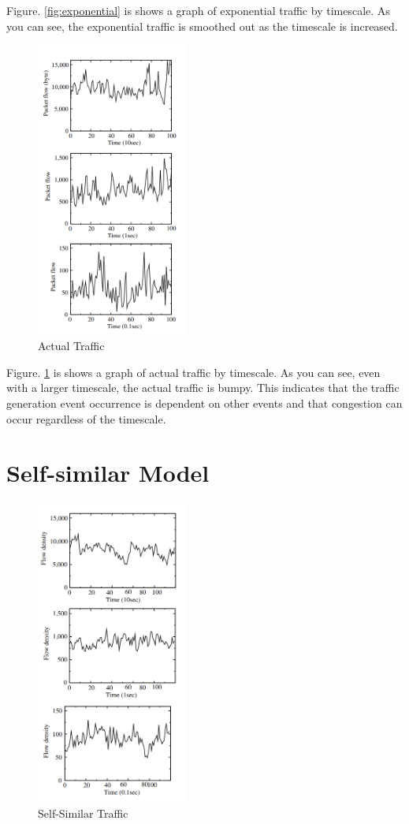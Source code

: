 Figure. \ref{fig:exponential} is shows a graph of exponential traffic by timescale.
As you can see, the exponential traffic is smoothed out as the timescale is increased.

  \begin{figure}[ht]
    \centering
    \includegraphics[width=5cm]{img/actual.png}
    \caption{Actual Traffic \protect \footnotemark}
    \label{fig:actual}  
  \end{figure}

Figure. \ref{fig:actual} is shows a graph of actual traffic by timescale.
As you can see, even with a larger timescale, the actual traffic is bumpy.
This indicates that the traffic generation event occurrence is dependent on other events and that congestion can occur regardless of the timescale.

\section{Self-similar Model}

  \begin{figure}[ht]
    \centering
    \includegraphics[width=5cm]{img/fractal.png}
    \caption{Self-Similar Traffic \protect \footnotemark}
    \label{fig:fractal}
  \end{figure}

